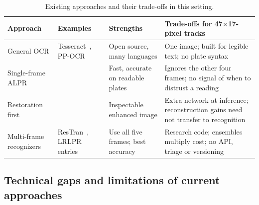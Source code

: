 \documentclass[11pt,a4paper]{article}
\begin{document}
\begin{table}[H]
\centering\small
\caption{Existing approaches and their trade-offs in this setting.}\label{tab:existing}
\begin{tabularx}{\textwidth}{@{}P{2.6cm}P{2.8cm}LL@{}}
\toprule
Approach & Examples & Strengths & Trade-offs for 47$\times$17-pixel tracks \\
\midrule
General OCR & Tesseract~\cite{smith2007tesseract}, PP-OCR~\cite{du2020ppocr} & Open source, many languages & One image; built for legible text; no plate syntax \\
Single-frame ALPR & \cite{laroca2021efficient,shi2017crnn,ke2023ultrafast} & Fast, accurate on readable plates & Ignores the other four frames; no signal of when to distrust a reading \\
Restoration first & \cite{nascimento2023sr,nascimento2025benchmark,wang2020tsrn,na2025mflpr2} & Inspectable enhanced image & Extra network at inference; reconstruction gains need not transfer to recognition \\
Multi-frame recognizers & ResTran~\cite{baselinecode}, LRLPR entries~\cite{laroca2026icpr} & Use all five frames; best accuracy & Research code; ensembles multiply cost; no API, triage or versioning \\
\bottomrule
\end{tabularx}
\end{table}

\subsection{Technical gaps and limitations of current approaches}
\end{document}
